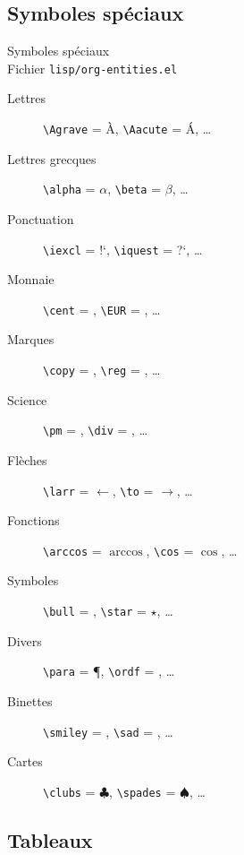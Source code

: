 \documentclass[presentation,t,hideothersubsections]{beamer}
\begin{document}
\subsection{Symboles spéciaux}
\label{sec-3-2}

\begin{frame}[fragile,label=sec-3-2-1]{Symboles spéciaux \\ Fichier \verb~lisp/org-entities.el~}
 \begin{description}
\item[Lettres] \texttt{\textbackslash{}Agrave} = \`{A}, \texttt{\textbackslash{}Aacute} = \'{A}, \ldots{}
\item[Lettres grecques] \texttt{\textbackslash{}alpha} = $\alpha$, \texttt{\textbackslash{}beta} = $\beta$, \ldots{}
\item[Ponctuation] \texttt{\textbackslash{}iexcl} = !`, \texttt{\textbackslash{}iquest} = ?`, \ldots{}
\item[Monnaie] \texttt{\textbackslash{}cent} = \textcent{}, \texttt{\textbackslash{}EUR} = \EUR{}, \ldots{}
\item[Marques] \texttt{\textbackslash{}copy} = \textcopyright{}, \texttt{\textbackslash{}reg} = \textregistered{}, \ldots{}
\item[Science] \texttt{\textbackslash{}pm} = \textpm{}, \texttt{\textbackslash{}div} = \textdiv{}, \ldots{}
\item[Flèches] \texttt{\textbackslash{}larr} = $\leftarrow$, \texttt{\textbackslash{}to} = $\to$, \ldots{}
\item[Fonctions] \texttt{\textbackslash{}arccos} = $\arccos$, \texttt{\textbackslash{}cos} = $\cos$, \ldots{}
\item[Symboles] \texttt{\textbackslash{}bull} = \textbullet{}, \texttt{\textbackslash{}star} = $\star$, \ldots{}
\item[Divers] \texttt{\textbackslash{}para} = \P{}, \texttt{\textbackslash{}ordf} = \textordfeminine{}, \ldots{}
\item[Binettes] \texttt{\textbackslash{}smiley} = \smiley{}, \texttt{\textbackslash{}sad} = \frownie{}, \ldots{}
\item[Cartes] \texttt{\textbackslash{}clubs} = $\clubsuit$, \texttt{\textbackslash{}spades} = $\spadesuit$, \ldots{}
\end{description}
\end{frame}
\subsection{Tableaux}
\label{sec-3-3}
\end{document}
